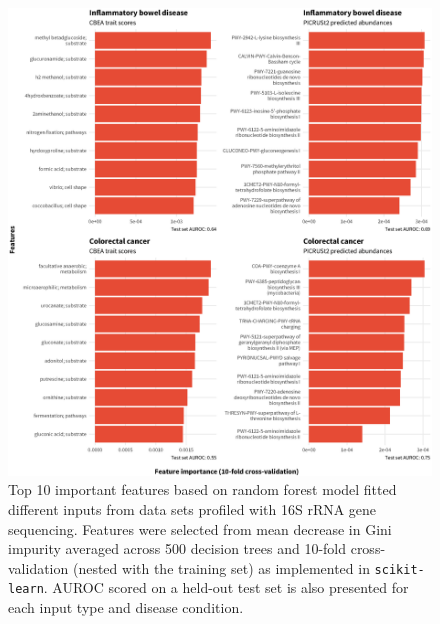 \begin{figure}
    \centering
    \includegraphics[width=\linewidth]{figures/appD_fs2.eps}
    \caption[Top 10 important features based on random forest model fitted different inputs from data sets profiled with 16S rRNA gene sequencing]{Top 10 important features based on random forest model fitted different inputs from data sets profiled with 16S rRNA gene sequencing. Features were selected from mean decrease in Gini impurity averaged across 500 decision trees and 10-fold cross-validation (nested with the training set) as implemented in \texttt{scikit-learn}. AUROC scored on a held-out test set is also presented for each input type and disease condition.}
    \label{fig:d2}
\end{figure}